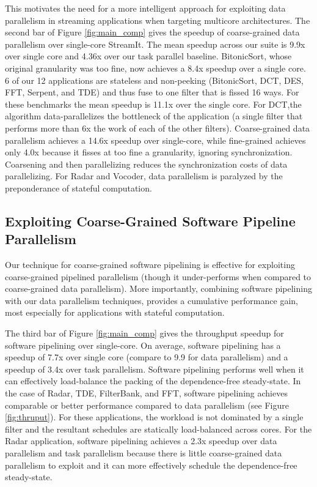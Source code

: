 This motivates the need for a more intelligent approach for exploiting
data parallelism in streaming applications when targeting multicore
architectures.  The second bar of Figure \ref{fig:main_comp} gives the
speedup of coarse-grained data parallelism over single-core
StreamIt. The mean speedup across our suite is 9.9x over single core
and 4.36x over our task parallel baseline.  BitonicSort, whose
original granularity was too fine, now achieves a 8.4x speedup over a
single core. 6 of our 12 applications are stateless and non-peeking
(BitonicSort, DCT, DES, FFT, Serpent, and TDE) and thus fuse to one
filter that is fissed 16 ways.  For these benchmarks the mean speedup
is 11.1x over the single core.  For DCT,the algorithm
data-parallelizes the bottleneck of the application (a single filter
that performs more than 6x the work of each of the other filters).
Coarse-grained data parallelism achieves a 14.6x speedup over
single-core, while fine-grained achieves only 4.0x because it fisses
at too fine a granularity, ignoring synchronization.  Coarsening and
then parallelizing reduces the synchronization costs of data
parallelizing.  For Radar and Vocoder, data parallelism is paralyzed
by the preponderance of stateful computation.

\subsection{Exploiting Coarse-Grained Software Pipeline Parallelism}

Our technique for coarse-grained software pipelining is effective for
exploiting coarse-grained pipelined parallelism (though it
under-performs when compared to coarse-grained data parallelism).
More importantly, combining software pipelining with our data
parallelism techniques, provides a cumulative performance gain, most
especially for applications with stateful computation.

The third bar of Figure \ref{fig:main_comp} gives the throughput
speedup for software pipelining over single-core.  On average,
software pipelining has a speedup of 7.7x over single core (compare to
9.9 for data parallelism) and a speedup of 3.4x over task
parallelism. Software pipelining performs well when it can effectively
load-balance the packing of the dependence-free steady-state.  In the
case of Radar, TDE, FilterBank, and FFT, software pipelining achieves
comparable or better performance compared to data parallelism (see
Figure \ref{fig:thruput}).  For these applications, the workload is
not dominated by a single filter and the resultant schedules are
statically load-balanced across cores.  For the Radar application,
software pipelining achieves a 2.3x speedup over data parallelism and
task parallelism because there is little coarse-grained data
parallelism to exploit and it can more effectively schedule the
dependence-free steady-state.


